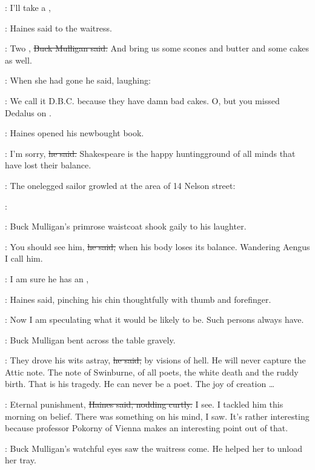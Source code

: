 \haines:
I'll take a ,

:
Haines said to the waitress.

\mulligan:
Two ,
\sout{Buck Mulligan said.}
And bring us some scones and butter
and some cakes as well.

:
When she had gone
he said, laughing:

\mulligan:
We call it D.B.C. because they have damn bad cakes.
O, but you missed
Dedalus on .

:
Haines opened his newbought book.%

\haines:
I'm sorry,
\sout{he said.}
Shakespeare is the happy huntingground of all minds
that have lost their balance.

\pagebreak[4]
\begin{interject}
    :
    The onelegged sailor growled at the area of 14 Nelson street:

    \smallskip
    \noindent\sailor:
\end{interject}

:
Buck Mulligan's primrose waistcoat shook gaily to his laughter.

\mulligan:
You should see him,
\sout{he said,}
when his body loses its balance.
Wandering Aengus I call him.

\haines:
I am sure he has an ,

:
Haines said,
pinching his chin thoughtfully with thumb and forefinger.

\haines:
Now I am speculating what it would be likely to be.%
Such persons always have.

:
Buck Mulligan bent across the table gravely.

\mulligan:
They drove his wits astray,
\sout{he said,}
by visions of hell.
He will never capture the Attic note.
The note of Swinburne,
of all poets,
the white death and the ruddy birth.
That is his tragedy.
He can never be a poet.
The joy of creation \ldots

\haines:
Eternal punishment,
\sout{Haines said,
nodding curtly.}
I see.
I tackled him
this morning on belief.
There was something on his mind, I saw.
It's rather interesting
because professor Pokorny of Vienna
makes an interesting point out of that.

:
Buck Mulligan's watchful eyes saw the waitress come.%
He helped her to unload her tray.

